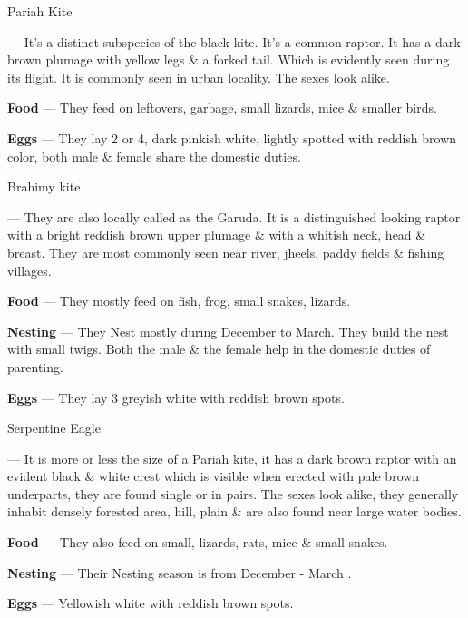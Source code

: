 \begin{bird}{Pariah Kite}

 --- It's a distinct subspecies of the black kite. It's a common raptor. It has a dark brown plumage with yellow legs \& a forked tail. Which is evidently seen during its flight. It is commonly seen in urban locality. The sexes look alike.

{\large\bf Food} --- They feed on leftovers, garbage, small lizards, mice \& smaller birds. 

{\large\bf Eggs} --- They lay 2 or 4, dark pinkish white, lightly spotted with reddish brown color, both male \& female share the domestic duties.
\end{bird}

\begin{bird}{Brahimy kite}

 --- They are also locally called as the Garuda. It is a distinguished looking raptor with a bright reddish brown upper plumage \& with a whitish neck, head \& breast. They  are most commonly seen near river, jheels, paddy fields \& fishing villages.

{\large\bf Food} --- They mostly feed on fish, frog, small snakes, lizards. 

{\large\bf Nesting} --- They Nest mostly during December to March. They build the nest with small twigs. Both  the male \& the female help in the domestic duties of parenting. 

{\large\bf Eggs} --- They lay 3 greyish white with reddish brown spots.
\end{bird}

\newpage

\begin{bird}{Serpentine Eagle}

 --- It is more or less the size of a Pariah kite, it has a dark brown raptor with an evident black \& white crest which is visible when erected with pale brown underparts, they are found single or in pairs. The sexes look alike, they generally inhabit densely forested area, hill, plain \& are also found near large water bodies.

{\large\bf Food} --- They also feed on small, lizards, rats, mice \& small snakes. 

{\large\bf Nesting} --- Their Nesting season is from December - March . 

{\large\bf Eggs} --- Yellowish white with reddish brown spots.
\end{bird}

